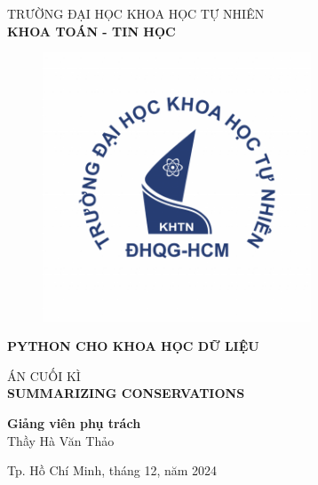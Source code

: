\begin{titlepage}

\begin{center}
TRƯỜNG ĐẠI HỌC KHOA HỌC TỰ NHIÊN\\
\textbf{KHOA TOÁN - TIN HỌC}

\begin{figure}[htp]
  \centering
  \includegraphics[width=8cm]{images/hcmus.png}
  \end{figure}

{\bfseries PYTHON CHO KHOA HỌC DỮ LIỆU\\[1cm] } 



{ \large {} ÁN CUỐI KÌ \\
  \bfseries SUMMARIZING CONSERVATIONS\\[3CM]} 

{\bfseries Giảng viên phụ trách\\}
  Thầy Hà Văn Thảo\\



\vfill
Tp. Hồ Chí Minh, tháng 12, năm 2024

\end{center}

\end{titlepage}